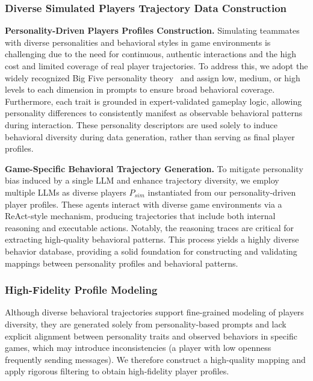 \documentclass{article}
\theoremstyle{plain}
\theoremstyle{definition}
\theoremstyle{remark}
\begin{document}
\subsubsection{Diverse Simulated Players Trajectory Data Construction}\label{sec:diver_sim_player}
\textbf{Personality-Driven Players Profiles Construction.} Simulating teammates with diverse personalities and behavioral styles in game environments is challenging due to the need for continuous, authentic interactions and the high cost and limited coverage of real player trajectories. To address this, we adopt the widely recognized Big Five personality theory~\cite{mccrae1999five} and assign low, medium, or high levels to each dimension in prompts to ensure broad behavioral coverage. Furthermore, each trait is grounded in expert-validated gameplay logic, allowing personality differences to consistently manifest as observable behavioral patterns during interaction. These personality descriptors are used solely to induce behavioral diversity during data generation, rather than serving as final player profiles.



\textbf{Game-Specific Behavioral Trajectory Generation.} To mitigate personality bias induced by a single LLM and enhance trajectory diversity, we employ multiple LLMs as diverse players $P_{sim}$ instantiated from our personality-driven player profiles. These agents interact with diverse game environments via a ReAct-style mechanism, producing trajectories that include both internal reasoning and executable actions. Notably, the reasoning traces are critical for extracting high-quality behavioral patterns. This process yields a highly diverse behavior database, providing a solid foundation for constructing and validating mappings between personality profiles and behavioral patterns.


\subsubsection{High-Fidelity Profile Modeling}\label{sec:high-fidelity}

Although diverse behavioral trajectories support fine-grained modeling of players diversity, they are generated solely from personality-based prompts and lack explicit alignment between personality traits and observed behaviors in specific games, which may introduce inconsistencies (a player with low openness frequently sending messages). We therefore construct a high-quality mapping and apply rigorous filtering to obtain high-fidelity player profiles.
\end{document}
